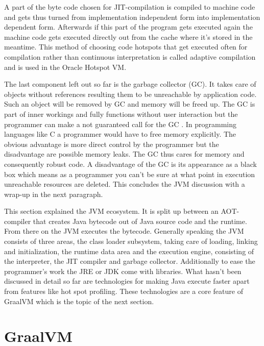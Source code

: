 A part of the byte code chosen for JIT-compilation is compiled to machine code and gets thus turned from implementation independent form into implementation dependent form. Afterwards if this part of the program gets executed again the machine code gets executed directly out from the cache where it's stored in the meantime. This method of choosing code hotspots that get executed often for compilation rather than continuous interpretation is called adaptive compilation and is used in the Oracle Hotspot VM. \cite{Lindholm}

The last component left out so far is the garbage collector (GC). It takes care of objects without references resulting them to be unreachable by application code. Such an object will be removed by GC and memory will be freed up. The GC is part of inner workings and fully functions without user interaction but the programmer can make a not guaranteed call for the GC \cite{Lindholm}. In programming languages like C a programmer would have to free memory explicitly. The obvious advantage is more direct control by the programmer but the disadvantage are possible memory leaks. The GC thus cares for memory and consequently robust code. A disadvantage of the GC is its appearance as a black box which means as a programmer you can't be sure at what point in execution unreachable resources are deleted. This concludes the JVM discussion with a wrap-up in the next paragraph.

This section explained the JVM ecosystem. It is split up between an AOT-compiler that creates Java bytecode out of Java source code and the runtime. From there on the JVM executes the bytecode. Generally speaking the JVM consists of three areas, the class loader subsystem, taking care of loading, linking and initialization, the runtime data area and the execution engine, consisting of the interpreter, the JIT compiler and garbage collector. Additionally to ease the programmer's work the JRE or JDK come with libraries. What hasn't been discussed in detail so far are technologies for making Java execute faster apart from features like hot spot profiling. These technologies are a core feature of GraalVM which is the topic of the next section.

\section{GraalVM}

